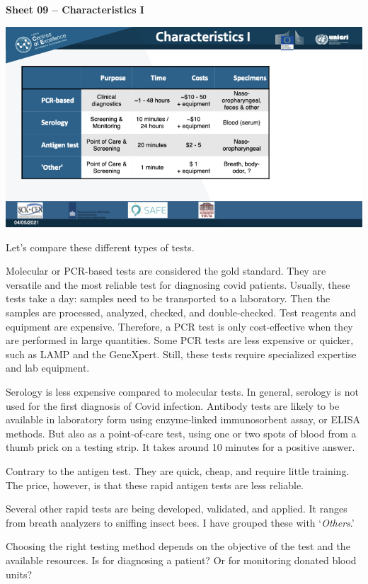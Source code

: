 \documentclass[
]{book}
\begin{document}
\textbf{Sheet 09 -- Characteristics I}

\includegraphics{images/m02/m02_types_of_rapid_tests_final.009.jpeg}

Let's compare these different types of tests.

Molecular or PCR-based tests are considered the gold standard. They are
versatile and the most reliable test for diagnosing covid patients.
Usually, these tests take a day: samples need to be transported to a
laboratory. Then the samples are processed, analyzed, checked, and
double-checked. Test reagents and equipment are expensive. Therefore, a
PCR test is only cost-effective when they are performed in large
quantities. Some PCR tests are less expensive or quicker, such as LAMP
and the GeneXpert. Still, these tests require specialized expertise and
lab equipment.

Serology is less expensive compared to molecular tests. In general,
serology is not used for the first diagnosis of Covid infection.
Antibody tests are likely to be available in laboratory form using
enzyme‐linked immunosorbent assay, or ELISA methods. But also as a
point‐of‐care test, using one or two spots of blood from a thumb prick
on a testing strip. It takes around 10 minutes for a positive answer.

Contrary to the antigen test. They are quick, cheap, and require little
training. The price, however, is that these rapid antigen tests are less
reliable.

Several other rapid tests are being developed, validated, and applied.
It ranges from breath analyzers to sniffing insect bees. I have grouped
these with `\emph{Others}.'

Choosing the right testing method depends on the objective of the test
and the available resources. Is for diagnosing a patient? Or for
monitoring donated blood units?
\end{document}
